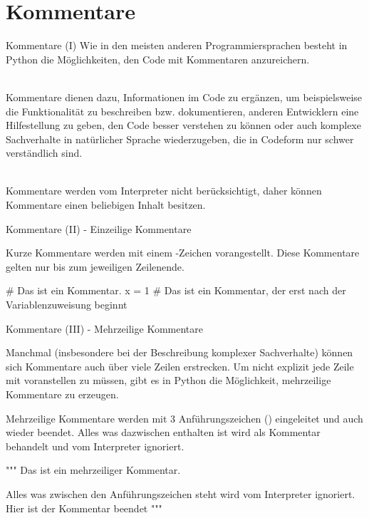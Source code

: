     \section{Kommentare}
        \begin{frame}{Kommentare (I)}
            Wie in den meisten anderen Programmiersprachen besteht in Python die Möglichkeiten, den Code mit Kommentaren anzureichern. \\~\
            
            Kommentare dienen dazu, Informationen im Code zu ergänzen, um beispielsweise die Funktionalität zu beschreiben bzw. dokumentieren, anderen Entwicklern eine Hilfestellung zu geben, den Code besser verstehen zu können oder auch komplexe Sachverhalte in natürlicher Sprache wiederzugeben, die in Codeform nur schwer verständlich sind. \\~\

            Kommentare werden vom Interpreter nicht berücksichtigt, daher können Kommentare einen beliebigen Inhalt besitzen.
        \end{frame}
        
        \begin{frame}[fragile]{Kommentare (II) - Einzeilige Kommentare}
            
            Kurze Kommentare werden mit einem \code{\#}-Zeichen vorangestellt. Diese Kommentare gelten nur bis zum jeweiligen Zeilenende.

\begin{pythoncode}
# Das ist ein Kommentar.            
x = 1 #  Das ist ein Kommentar, der erst nach der Variablenzuweisung beginnt
\end{pythoncode}
        \end{frame}
        
        \begin{frame}[fragile]{Kommentare (III) - Mehrzeilige Kommentare}
            
            Manchmal (insbesondere bei der Beschreibung komplexer Sachverhalte) können sich Kommentare auch über viele Zeilen erstrecken. Um nicht explizit jede Zeile mit \code{\#} voranstellen zu müssen, gibt es in Python die Möglichkeit, mehrzeilige Kommentare zu erzeugen.
            
            Mehrzeilige Kommentare werden mit 3 Anführungszeichen () eingeleitet und auch wieder beendet.
            Alles was dazwischen enthalten ist wird als Kommentar behandelt und vom Interpreter ignoriert.
\begin{pythoncode}
"""
Das ist ein mehrzeiliger Kommentar.

Alles was zwischen den Anführungszeichen steht wird vom Interpreter ignoriert.
Hier ist der Kommentar beendet
"""
\end{pythoncode}
        \end{frame}
    
